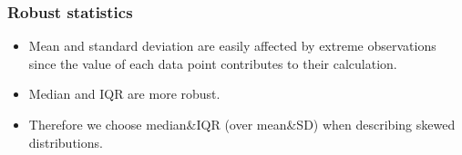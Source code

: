 \documentclass[slidestop,compress,mathserif,12pt,t,professionalfonts,xcolor=table]{beamer}
\begin{document}
\begin{frame}
\frametitle{Robust statistics}

\begin{itemize}

\item Mean and standard deviation are easily affected by extreme observations since the value of each data point contributes to their calculation.

\item Median and IQR are more robust.

\item Therefore we choose median\&IQR (over mean\&SD) when describing skewed distributions.

\end{itemize}


\end{frame}

\end{document}
